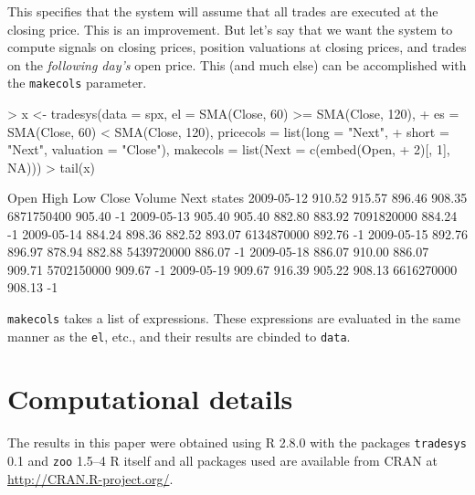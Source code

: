 \documentclass[a4]{article}
\newcommand{\code}[1]{\texttt{#1}}
\begin{document}
This specifies that the system will assume that all trades are
executed at the closing price. This is an improvement. But let's say
that we want the system to compute signals on closing prices, position
valuations at closing prices, and trades on the \emph{following day's}
open price. This (and much else) can be accomplished with the
\code{makecols} parameter.
\begin{Schunk}
\begin{Sinput}
> x <- tradesys(data = spx, el = SMA(Close, 60) >= SMA(Close, 120), 
+     es = SMA(Close, 60) < SMA(Close, 120), pricecols = list(long = "Next", 
+         short = "Next", valuation = "Close"), makecols = list(Next = c(embed(Open, 
+         2)[, 1], NA)))
> tail(x)
\end{Sinput}
\begin{Soutput}
             Open   High    Low  Close     Volume   Next states
2009-05-12 910.52 915.57 896.46 908.35 6871750400 905.40     -1
2009-05-13 905.40 905.40 882.80 883.92 7091820000 884.24     -1
2009-05-14 884.24 898.36 882.52 893.07 6134870000 892.76     -1
2009-05-15 892.76 896.97 878.94 882.88 5439720000 886.07     -1
2009-05-18 886.07 910.00 886.07 909.71 5702150000 909.67     -1
2009-05-19 909.67 916.39 905.22 908.13 6616270000 908.13     -1
\end{Soutput}
\end{Schunk}
\code{makecols} takes a list of expressions. These expressions are
evaluated in the same manner as the \code{el}, etc., and their results
are cbinded to \code{data}. 

\section*{Computational details}
The results in this paper were obtained using R
2.8.0 with the packages
\code{tradesys} 0.1 
and \code{zoo}  1.5--4 R itself
and all packages used are available from CRAN at
\url{http://CRAN.R-project.org/}.
\end{document}
